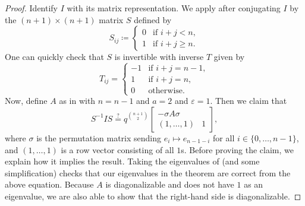 \begin{proof}
    Identify $I$ with its matrix representation. We apply  after conjugating $I$ by the $(n+1)\times(n+1)$ matrix $S$ defined by
    \[S_{ij}\coloneqq\begin{cases}
        0 & \text{if }i+j<n, \\
        1 & \text{if }i+j\ge n.
    \end{cases}\]
    One can quickly check that $S$ is invertible with inverse $T$ given by
    \[T_{ij}=\begin{cases}
        -1 & \text{if }i+j=n-1, \\
        1 & \text{if }i+j=n, \\
        0 & \text{otherwise}.
    \end{cases}\]
    Now, define $A$ as in  with $n=n-1$ and $a=2$ and $\varepsilon=1$. Then we claim that
    \begin{equation}
        S^{-1}IS\stackrel?=q^{\binom{n+1}2}\begin{bmatrix}
            -\sigma A\sigma \\
            (1,\ldots,1) & 1
        \end{bmatrix}, \label{eq:conjugate-sp-trivial}
    \end{equation}
    where $\sigma$ is the permutation matrix sending $e_i\mapsto e_{n-1-i}$ for all $i\in\{0,\ldots,n-1\}$, and $(1,\ldots,1)$ is a row vector consisting of all $1$s. Before proving the claim, we explain how it implies the result. Taking the eigenvalues of  (and some simplification) checks that our eigenvalues in the theorem are correct from the above equation. Because $A$ is diagonalizable and does not have $1$ as an eigenvalue, we are also able to show that the right-hand side is diagonalizable.


\end{proof}

